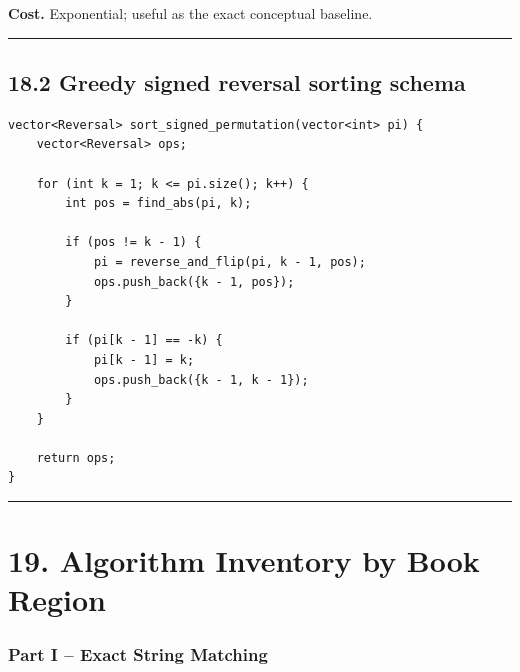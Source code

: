 \documentclass[11pt]{article}
\begin{document}
\textbf{Cost.} Exponential; useful as the exact conceptual baseline.

\begin{center}\rule{0.5\linewidth}{0.5pt}\end{center}

\subsection{18.2 Greedy signed reversal sorting schema}\label{greedy-signed-reversal-sorting-schema}

\begin{verbatim}
vector<Reversal> sort_signed_permutation(vector<int> pi) {
    vector<Reversal> ops;

    for (int k = 1; k <= pi.size(); k++) {
        int pos = find_abs(pi, k);

        if (pos != k - 1) {
            pi = reverse_and_flip(pi, k - 1, pos);
            ops.push_back({k - 1, pos});
        }

        if (pi[k - 1] == -k) {
            pi[k - 1] = k;
            ops.push_back({k - 1, k - 1});
        }
    }

    return ops;
}
\end{verbatim}

\begin{center}\rule{0.5\linewidth}{0.5pt}\end{center}

\section{19. Algorithm Inventory by Book Region}\label{algorithm-inventory-by-book-region}

\subsubsection{Part I -- Exact String Matching}\label{part-i-exact-string-matching}
\end{document}
